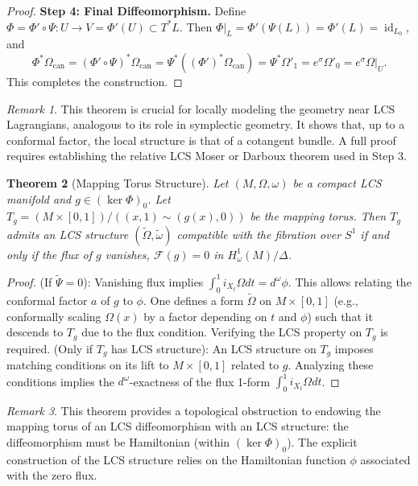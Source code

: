 \documentclass[11pt,a4paper]{amsart}
\newtheorem{theorem}{Theorem}[section]
\theoremstyle{definition}
\theoremstyle{remark}
\newtheorem{remark}[theorem]{Remark}
\newcommand{\id}{\operatorname{id}}
\begin{document}
\begin{proof}
		\textbf{Step 4: Final Diffeomorphism.} Define $\Phi = \Phi' \circ \Psi : U \to V = \Phi'(U) \subset T^*L$. Then $\Phi|_L = \Phi'(\Psi(L)) = \Phi'(L) = \id_{L_0}$, and
		\[
		\Phi^*\Omega_{\text{can}} = (\Phi' \circ \Psi)^*\Omega_{\text{can}} = \Psi^*((\Phi')^*\Omega_{\text{can}}) = \Psi^*\Omega'_1 = e^\sigma \Omega'_0 = e^\sigma \Omega|_U.
		\]
		This completes the construction.
	\end{proof}
	
	\begin{remark}
		This theorem is crucial for locally modeling the geometry near LCS Lagrangians, analogous to its role in symplectic geometry. It shows that, up to a conformal factor, the local structure is that of a cotangent bundle. A full proof requires establishing the relative LCS Moser or Darboux theorem used in Step 3.
	\end{remark}
	
	\begin{theorem}[Mapping Torus Structure] \label{thm:mapping_torus}
		Let $(M, \Omega, \omega)$ be a compact LCS manifold and $g \in (\ker \Phi)_0$. Let $T_g = (M \times [0,1])/((x, 1) \sim (g(x), 0))$ be the mapping torus. Then $T_g$ admits an LCS structure $(\tilde{\Omega}, \tilde{\omega})$ compatible with the fibration over $S^1$ if and only if the flux of $g$ vanishes, $\mathcal{F}(g) = 0$ in $H_\omega^1(M)/\Delta$.
	\end{theorem}
	
	\begin{proof}
		(If $\widetilde{\Psi} = 0$): Vanishing flux implies $\int_0^1 i_{X_t}\Omega dt = d^\omega \phi$. This allows relating the conformal factor $a$ of $g$ to $\phi$. One defines a form $\tilde{\Omega}$ on $M \times [0,1]$ (e.g., conformally scaling $\Omega(x)$ by a factor depending on $t$ and $\phi$) such that it descends to $T_g$ due to the flux condition. Verifying the LCS property on $T_g$ is required. (Only if $T_g$ has LCS structure): An LCS structure on $T_g$ imposes matching conditions on its lift to $M \times [0,1]$ related to $g$. Analyzing these conditions implies the $d^\omega$-exactness of the flux 1-form $\int_0^1 i_{X_t}\Omega dt$.
	\end{proof}
	
	\begin{remark}
		This theorem provides a topological obstruction to endowing the mapping torus of an LCS diffeomorphism with an LCS structure: the diffeomorphism must be Hamiltonian (within $(\ker \Phi)_0$). The explicit construction of the LCS structure relies on the Hamiltonian function $\phi$ associated with the zero flux.
	\end{remark}
	
\end{document}

